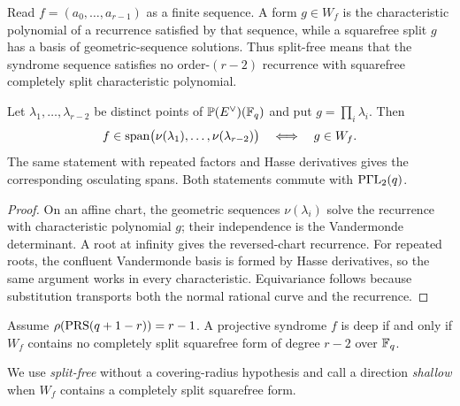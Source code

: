 Read \(f=(a_0,\ldots,a_{r-1})\) as a finite sequence.  A form
\(g\in W_f\) is the characteristic polynomial of a recurrence
satisfied by that sequence, while a squarefree split \(g\) has a basis
of geometric-sequence solutions.  Thus split-free means that the
syndrome sequence satisfies no order-\((r-2)\) recurrence with
squarefree completely split characteristic polynomial.

\begin{lemma}\label{lem:hankel}%
%
%
Let $\lambda_1,\ldots,\lambda_{r-2}$ be distinct points of
$\mathbb P(E^\vee)(\mathbb F_q)$ and put $g=\prod_i\lambda_i$.  Then
\[
 f\in\operatorname{span}\bigl(\nu(\lambda_1),\ldots,\nu(\lambda_{r-2})\bigr)
 \quad\Longleftrightarrow\quad g\in W_f.
\]
The same statement with repeated factors and Hasse derivatives gives
the corresponding osculating spans.  Both statements commute with
$\mathrm{P}\Gamma\mathrm{L}_2(q)$.
\end{lemma}

\begin{proof}
On an affine chart, the geometric sequences
\(\nu(\lambda_i)\) solve the recurrence with characteristic polynomial
\(g\); their independence is the Vandermonde determinant.  A root at
infinity gives the reversed-chart recurrence.  For repeated roots, the
confluent Vandermonde basis is formed by Hasse derivatives, so the same
argument works in every characteristic.  Equivariance follows because
substitution transports both the normal rational curve and the
recurrence.
\end{proof}

\begin{corollary}\label{cor:splitfree}%
%
%
Assume $\rho(\operatorname{PRS}(q+1-r))=r-1$.  A projective syndrome $f$ is deep if
and only if $W_f$ contains no completely split squarefree form of
degree $r-2$ over $\mathbb F_q$.
\end{corollary}

We use \emph{split-free} without a covering-radius hypothesis and call
a direction \emph{shallow} when \(W_f\) contains a completely split
squarefree form.

